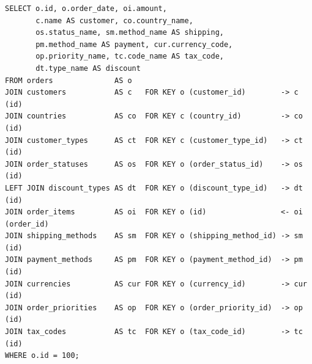 \documentclass[12pt]{article}
\newcommand{\FanoutCheckHeight}[3]{%
  \ifdim\dimexpr\ht#1+\dp#1\relax>#2\relax
    \PackageError{fanout-layout}{#3 exceeds its vertical allocation}%
      {Adjust the terminal line spacing or the box position.}%
  \fi
}
\begin{document}
\newsavebox{\canonicalStageSeven}
\begin{lrbox}{\canonicalStageSeven}\begin{minipage}{344mm}
\begin{NoHyper}
\begin{lstlisting}[style=complex-sql]
SELECT o.id, o.order_date, oi.amount,
       c.name AS customer, co.country_name,
       os.status_name, sm.method_name AS shipping,
       pm.method_name AS payment, cur.currency_code,
       op.priority_name, tc.code_name AS tax_code,
       dt.type_name AS discount
FROM orders              AS o
JOIN customers           AS c   FOR KEY o (customer_id)        -> c (id)
JOIN countries           AS co  FOR KEY c (country_id)         -> co (id)
JOIN customer_types      AS ct  FOR KEY c (customer_type_id)   -> ct (id)
JOIN order_statuses      AS os  FOR KEY o (order_status_id)    -> os (id)
LEFT JOIN discount_types AS dt  FOR KEY o (discount_type_id)   -> dt (id)
JOIN order_items         AS oi  FOR KEY o (id)                 <- oi (order_id)
JOIN shipping_methods    AS sm  FOR KEY o (shipping_method_id) -> sm (id)
JOIN payment_methods     AS pm  FOR KEY o (payment_method_id)  -> pm (id)
JOIN currencies          AS cur FOR KEY o (currency_id)        -> cur (id)
JOIN order_priorities    AS op  FOR KEY o (order_priority_id)  -> op (id)
JOIN tax_codes           AS tc  FOR KEY o (tax_code_id)        -> tc (id)
WHERE o.id = 100;
\end{lstlisting}
\end{NoHyper}
\end{minipage}\end{lrbox}
\FanoutCheckHeight{\canonicalStageSeven}{122mm}{Canonical-form state 7}
\end{document}
